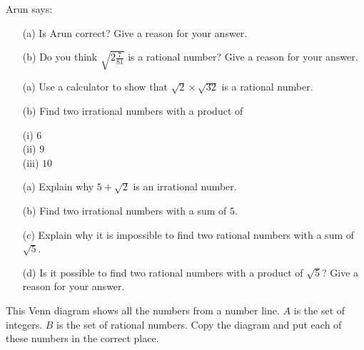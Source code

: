 \begin{multicols}{2}
\columnbreak

\begin{uzd}
Arun says:



\begin{itemize}
\item[(a)] Is Arun correct? Give a reason for your answer.
\item[(b)] Do you think $\sqrt{2 \tfrac{7}{81}}$ is a rational number? Give a reason for your answer.
\end{itemize}
\end{uzd}

\begin{uzd}
\phantom{a}

\begin{itemize}
\item[(a)] Use a calculator to show that $\sqrt{2} \times \sqrt{32}$ is a rational number.
\item[(b)] Find two irrational numbers with a product of
\resetcolumnrule
\begin{multicols}{3}
(i) $6$ \\ 
(ii) $9$ \\ 
(iii) $10$
\end{multicols}
\end{itemize}
\end{uzd}

\begin{uzd}
\phantom{a}

\begin{itemize}
\item[(a)] Explain why $5 + \sqrt{2}$ is an irrational number.
\item[(b)] Find two irrational numbers with a sum of $5$.
\item[(c)] Explain why it is impossible to find two rational numbers with a sum of $\sqrt{5}$.
\item[(d)] Is it possible to find two rational numbers with a product of $\sqrt{5}$? Give a reason for your answer.
\end{itemize}
\end{uzd}

\begin{uzd}
This Venn diagram shows all the numbers from a number line.  
$A$ is the set of integers.
$B$ is the set of rational numbers.  
Copy the diagram and put each of these numbers in the correct place.  


\end{uzd}
\end{multicols}
